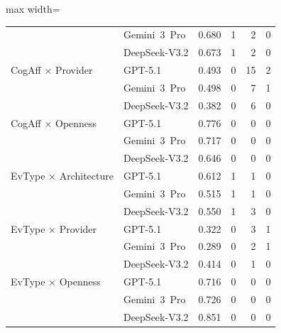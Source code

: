 \begin{table}[H]
\begin{adjustbox}{max width=\textwidth}
\begin{tabular}{llrrrr}
 & Gemini~3~Pro & 0.680 & 1 & 2 & 0 \\
 & DeepSeek-V3.2 & 0.673 & 1 & 2 & 0 \\
CogAff × Provider & GPT-5.1 & 0.493 & 0 & 15 & 2 \\
 & Gemini~3~Pro & 0.498 & 0 & 7 & 1 \\
 & DeepSeek-V3.2 & 0.382 & 0 & 6 & 0 \\
CogAff × Openness & GPT-5.1 & 0.776 & 0 & 0 & 0 \\
 & Gemini~3~Pro & 0.717 & 0 & 0 & 0 \\
 & DeepSeek-V3.2 & 0.646 & 0 & 0 & 0 \\
EvType × Architecture & GPT-5.1 & 0.612 & 1 & 1 & 0 \\
 & Gemini~3~Pro & 0.515 & 1 & 1 & 0 \\
 & DeepSeek-V3.2 & 0.550 & 1 & 3 & 0 \\
EvType × Provider & GPT-5.1 & 0.322 & 0 & 3 & 1 \\
 & Gemini~3~Pro & 0.289 & 0 & 2 & 1 \\
 & DeepSeek-V3.2 & 0.414 & 0 & 1 & 0 \\
EvType × Openness & GPT-5.1 & 0.716 & 0 & 0 & 0 \\
 & Gemini~3~Pro & 0.726 & 0 & 0 & 0 \\
 & DeepSeek-V3.2 & 0.851 & 0 & 0 & 0 \\
\bottomrule
\end{tabular}
\end{adjustbox}
\end{table}